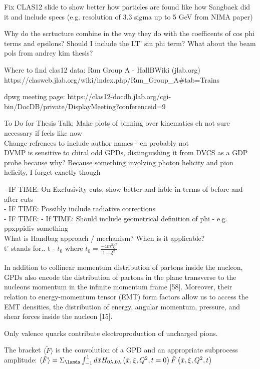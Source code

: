 Fix CLAS12 slide to show better how particles are found like how Sangbaek did it and include specs (e.g. resolution of 3.3 sigma up to 5 GeV from NIMA paper)

Why do the scrtucture combine in the way they do with the coefficents of cos phi terms and epsilons? Should I include the LT' sin phi term? What about the beam pols from andrey kim thesis?

Where to find clas12 data:
Run Group A - HallBWiki (jlab.org)
https://clasweb.jlab.org/wiki/index.php/Run_Group_A#tab=Trains

dpwg meeting page: https://clas12-docdb.jlab.org/cgi-bin/DocDB/private/DisplayMeeting?conferenceid=9



To Do for Thesis Talk:
Make plots of binning over kinematics eh not sure necessary if feels like now\\
Change refrences to include author names - eh probably not\\

 DVMP is sensitive to chiral odd GPDs, distinguishing it from DVCS as a GDP probe because why? Because something involving photon helicity and pion helicity, I forget exactly though
 
 - IF TIME: On Exclusivity cuts, show better and lable in terms of before and after cuts\\
- IF TIME: Possibly include radiative corrections\\
- IF TIME: 
- If TIME: Should include geometrical definition of phi - e.g. ppxppidiv something\\

What is Handbag approach / mechanism? When is it applicable?\\
t' stands for.. t - $t_0$ where $t_0 = \frac{-4m^2\xi^2}{1-\xi^2}$


In addition to collinear momentum distribution of partons inside the
nucleon, GPDs also encode the distribution of partons in the plane transverse to
the nucleons momentum in the infinite momentum frame [58]. Moreover, their
relation to energy-momentum tensor (EMT) form factors allow us to access the
EMT densities, the distribution of energy, angular momentum, pressure, and shear
forces inside the nucleon [15].

    Only valence quarks contribute electroproduction
of uncharged pions.

  The bracket $\langle \tilde{F} \rangle$ is the convolution of a GPD and an appropriate subprocess amplitude:
    $\langle \tilde{F} \rangle = \Sigma_{\lamda} \int_{-1}^{1} d\bar{x}H_{0\lambda,0\lambda}\left( \bar{x}, \xi, Q^2, t=0  \right)\tilde{F}\left( \bar{x}, \xi, Q^2, t  \right)\
    $ 
    
